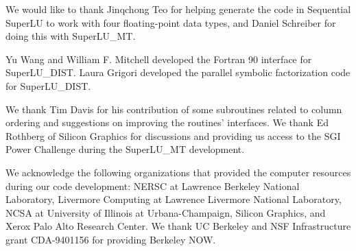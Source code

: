 We would like to thank Jinqchong Teo for helping generate the code
in Sequential SuperLU to work with four floating-point data types,
and Daniel Schreiber for doing this with SuperLU\_MT.

Yu Wang and William F. Mitchell developed the Fortran 90
interface for SuperLU\_DIST.  Laura Grigori developed the
parallel symbolic factorization code for SuperLU\_DIST.

We thank Tim Davis for his contribution of some subroutines related
to column ordering and suggestions on improving the routines' interfaces.
We thank Ed Rothberg of Silicon Graphics for discussions and providing
us access to the SGI Power Challenge during the SuperLU\_MT development.

We acknowledge the following organizations that provided the
computer resources during our code development:
NERSC at Lawrence Berkeley National Laboratory, Livermore Computing
at Lawrence Livermore National Laboratory, NCSA at University of
Illinois at Urbana-Champaign, Silicon Graphics, and
Xerox Palo Alto Research Center. 
We thank UC Berkeley and NSF Infrastructure grant CDA-9401156
for providing Berkeley NOW.

